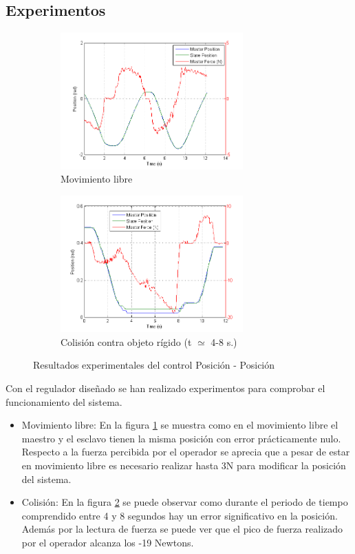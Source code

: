 \subsection{Experimentos}
\label{sub:pos-pos-exp}
\begin{figure}[htbp]
\centering
	\begin{subfigure}[h]
		\centering
		\includegraphics[height=5.25cm]{pos-pos-exp-libre}
		\caption{Movimiento libre}
		\label{fig:pos-pos-exp-libre}
	\end{subfigure}
	\hspace{0.1cm}
	\begin{subfigure}[h]
		\centering
		\includegraphics[height=5.25cm]{pos-pos-exp-env}
		\caption{Colisión contra objeto rígido (t $\simeq$ 4-8 s.)}
		\label{fig:pos-pos-exp-env}
    \end{subfigure}
	\caption{Resultados experimentales del control Posición - Posición}
  	\label{fig:pos-pos-exp}
\end{figure}

Con el regulador diseñado se han realizado experimentos para comprobar el funcionamiento del sistema.
\begin{itemize}
\item Movimiento libre: En la figura \ref{fig:pos-pos-exp-libre} se muestra como en el movimiento libre el maestro y el esclavo tienen la misma posición con error prácticamente nulo. Respecto a la fuerza percibida por el operador se aprecia que a pesar de estar en movimiento libre es necesario realizar hasta 3N para modificar la posición del sistema.
\item Colisión: En la figura \ref{fig:pos-pos-exp-env} se puede observar como durante el periodo de tiempo comprendido entre 4 y 8 segundos hay un error significativo en la posición. Además por la lectura de fuerza se puede ver que el pico de fuerza realizado por el operador alcanza los -19 Newtons.
\end{itemize}

